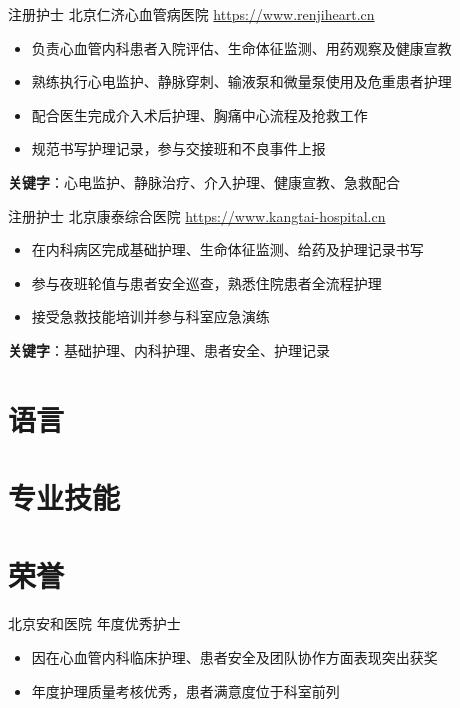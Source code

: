 \documentclass[a4paper, serif, 10pt]{moderncv}
\begin{document}
        {注册护士}
        {北京仁济心血管病医院}
        {\url{https://www.renjiheart.cn}}
        {}
        {\begin{itemize}
\item 负责心血管内科患者入院评估、生命体征监测、用药观察及健康宣教
\item 熟练执行心电监护、静脉穿刺、输液泵和微量泵使用及危重患者护理
\item 配合医生完成介入术后护理、胸痛中心流程及抢救工作
\item 规范书写护理记录，参与交接班和不良事件上报
\end{itemize}
\textbf{关键字}：心电监护、静脉治疗、介入护理、健康宣教、急救配合}

        {注册护士}
        {北京康泰综合医院}
        {\url{https://www.kangtai-hospital.cn}}
        {}
        {\begin{itemize}
\item 在内科病区完成基础护理、生命体征监测、给药及护理记录书写
\item 参与夜班轮值与患者安全巡查，熟悉住院患者全流程护理
\item 接受急救技能培训并参与科室应急演练
\end{itemize}
\textbf{关键字}：基础护理、内科护理、患者安全、护理记录}
\section{语言}

\section{专业技能}

\section{荣誉}

        {北京安和医院}
        {年度优秀护士}
        {}
        {}
        {\begin{itemize}
\item 因在心血管内科临床护理、患者安全及团队协作方面表现突出获奖
\item 年度护理质量考核优秀，患者满意度位于科室前列
\end{itemize}}
\end{document}
